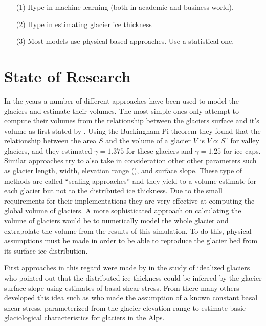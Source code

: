 \begin{itemize}
	\item[(1)] Hype in machine learning (both in academic and business world).
	\item[(2)] Hype in estimating glacier ice thickness
	\item[(3)] Most models use physical based approaches. Use a statistical one.
\end{itemize}
 


\section{State of Research}\label{research}
In the years a number of different approaches have been used to model the glaciers and estimate their volumes.
The most simple ones only attempt to compute their volumes from the relationship between the glaciers surface and it's volume as first stated by \citet{bahr1997}. Using the Buckingham Pi
theorem they found that the relationship between the area $S$ and the volume of a glacier $V$ is $V \propto S^{\gamma}$ for valley glaciers, and they estimated $\gamma=1.375$ for these glaciers and $\gamma=1.25$ for ice caps. Similar approaches try to also take in consideration other other parameters such as glacier length, width, elevation range (\cite{Grinsted2013}), and surface slope. These type of methods are called ``scaling approaches'' and they yield to a volume estimate for each glacier but not to the distributed ice thickness. Due to the small requirements for their implementations they are very effective at computing the global volume of glaciers.
A more sophisticated approach on calculating the volume of glaciers would be to numerically model the whole glacier and extrapolate the volume from the results of this simulation. To do this, physical assumptions must be made in order to be able to reproduce the glacier bed from its surface ice distribution.

First approaches in this regard were made by \citet{Nye1965} in the study of  idealized glaciers who pointed out that the distributed ice thickness could be inferred by the glacier surface slope using estimates of basal shear stress. From there many others developed this idea such as \citet{haeberli_hoelzle_1995} who made the assumption of a known constant basal shear stress, parameterized from the glacier elevation range to estimate basic glaciological characteristics for glaciers in the Alps. 


